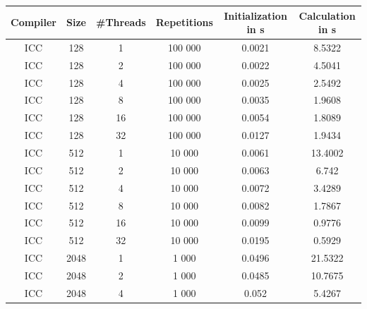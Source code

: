 \documentclass[german,plainarticle,hyperref,utf8]{zihpub}
\begin{document}
	\begin{table}
		\begin{center}
			\begin{tabular}{||c c c c c c||}
				\hline
				Compiler & Size  & \#Threads & Repetitions & Initialization in s & Calculation in s \\ [1ex]
				\hline\hline
				ICC      & 128   & 1         & 100 000     & 0.0021                   & 8.5322                \\
				\hline
				ICC      & 128   & 2         & 100 000     & 0.0022                   & 4.5041                \\
				\hline
				ICC      & 128   & 4         & 100 000     & 0.0025                   & 2.5492                \\
				\hline
				ICC      & 128   & 8         & 100 000     & 0.0035                   & 1.9608                \\
				\hline
				ICC      & 128   & 16        & 100 000     & 0.0054                   & 1.8089                \\
				\hline
				ICC      & 128   & 32        & 100 000     & 0.0127                   & 1.9434                \\
				\hline\hline
				ICC      & 512   & 1         & 10 000      & 0.0061                   & 13.4002                \\
				\hline
				ICC      & 512   & 2         & 10 000      & 0.0063                   & 6.742                \\
				\hline
				ICC      & 512   & 4         & 10 000      & 0.0072                   & 3.4289                \\
				\hline
				ICC      & 512   & 8         & 10 000      & 0.0082                   & 1.7867                \\
				\hline
				ICC      & 512   & 16        & 10 000      & 0.0099                   & 0.9776                \\
				\hline
				ICC      & 512   & 32        & 10 000      & 0.0195                   & 0.5929                \\
				\hline\hline
				ICC      & 2048  & 1         & 1 000       & 0.0496                   & 21.5322                \\
				\hline
				ICC      & 2048  & 2         & 1 000       & 0.0485                   & 10.7675                \\
				\hline
				ICC      & 2048  & 4         & 1 000       & 0.052                   & 5.4267                \\

\end{tabular}
\end{center}
\end{table}
\end{document}
